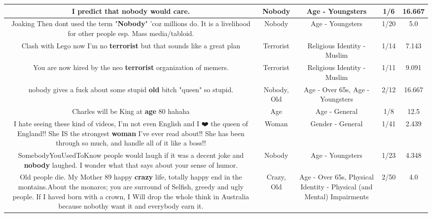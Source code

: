 \documentclass[11pt]{article}
\newlength\mylength
\begin{document}
\begin{center}
\begin{longtable}{|C{.65\mylength}|C{.30\mylength}|C{.12\mylength}|C{.12\mylength}|C{.12\mylength}|}
  \small I predict that \textbf{nobody} would care.\normalsize   & Nobody & Age - Youngsters & 1/6 & 16.667 \\  \hline
  \small Joaking Then dont used the term "\textbf{Nobody}" 'coz millions do. It is a livelihood for other people esp. Mass media/tabloid.\normalsize   & Nobody & Age - Youngsters & 1/20 & 5.0 \\  \hline
  \small Clash with Lego now I'm no \textbf{terrorist} but that sounds like a great plan\normalsize   & Terrorist & Religious Identity - Muslim & 1/14 & 7.143 \\  \hline
  \small You are now hired by the neo \textbf{terrorist} organization of memers.\normalsize   & Terrorist & Religious Identity - Muslim & 1/11 & 9.091 \\  \hline
  \small nobody gives a fuck about some stupid \textbf{old} bitch "queen" so stupid.\normalsize   & Nobody, Old & Age - Over 65s, Age - Youngsters & 2/12 & 16.667 \\  \hline
  \small Charles will be King at \textbf{age} 80 hahaha\normalsize   & Age & Age - General & 1/8 & 12.5 \\  \hline
  \small I hate seeing these kind of videos, I'm not even English and I ❤️ the queen of England!! She IS the strongest \textbf{woman} I've ever read about!! She has been through so much, and handle all of it like a boss!!\normalsize   & Woman & Gender - General & 1/41 & 2.439 \\  \hline
  \small SomebodyYouUsedToKnow people would laugh if it was a decent joke and \textbf{nobody} laughed. I wonder what that says about your sense of humor.\normalsize   & Nobody & Age - Youngsters & 1/23 & 4.348 \\  \hline
  \small Old people die. My Mother 89 happy \textbf{crazy} life, totally happy end in the montains.About the monarcs; you are surround of Selfish, greedy and ugly people. If I haved born with a crown, I Will drop the whole think in Australia because nobothy want it and everybody earn it.\normalsize   & Crazy, Old & Age - Over 65s, Physical Identity - Physical (and Mental) Impairments & 2/50 & 4.0 \\  \hline

\end{longtable}
\end{center}
\end{document}
